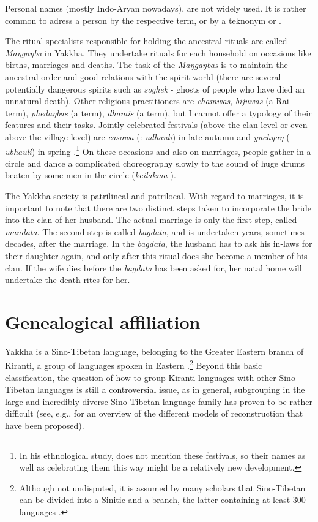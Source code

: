 Personal names (mostly Indo-Aryan nowadays), are not widely used. It is rather common to adress a person by the respective  term, or by a teknonym  or . 

The ritual specialists responsible for holding the ancestral rituals are called \emph{Maŋgaŋba} in Yakkha. They undertake rituals for each household on occasions like births, marriages and deaths. The task of the \emph{Maŋgaŋbas} is to maintain the ancestral order and good relations with the spirit world (there are several potentially dangerous spirits such as \emph{soghek} - ghosts of people who have died an unnatural death). Other religious practitioners are \emph{chamwas},  \emph{bijuwas} (a Rai term), \emph{phedaŋbas} (a  term), \emph{dhamis} (a  term), but I cannot offer a typology of their features and their tasks. Jointly celebrated festivals (above the clan level or even above the village level) are \emph{casowa} (: \emph{udhauli}) in late autumn and \emph{yuchyaŋ} ( \emph{ubhauli}) in spring \citep[102]{Kongren2007Indigenous}.\footnote{In his ethnological study, \citet{Russell1992_Yakha}  does not mention these festivals, so their names as well as  celebrating them this way might be a relatively new development.} On these occasions and also on marriages, people gather in a circle and dance a complicated choreography slowly to the sound of huge drums beaten by some men in the circle (\emph{keilakma} ).

The Yakkha society is patrilineal and patrilocal. With regard to marriages, it is important to note that there are two distinct steps taken to incorporate the bride into the clan of her husband. The actual marriage is only the first step, called \emph{mandata}. The second step is called \emph{bagdata}, and is undertaken years, sometimes decades, after the marriage. In the \emph{bagdata}, the husband has to ask his in-laws for their daughter again, and only after this ritual does she become a member of his clan. If the wife dies before the \emph{bagdata} has been asked for, her natal home will undertake the death rites for her.

 
\section{Genealogical affiliation}\label{genetic}

Yakkha is a Sino-Tibetan language, belonging to the Greater Eastern branch of Kiranti, a group of  languages spoken in Eastern .\footnote{Although not  undisputed, it is assumed by many scholars that Sino-Tibetan can be divided into a Sinitic and a  branch, the latter containing at least 300 languages \citep{Bradley1997_Tibeto-Burman, Matisoff2003Handbook}.}  Beyond this basic classification, the question of how to group Kiranti languages with other Sino-Tibetan languages is still a controversial issue, as in general, subgrouping in the large and incredibly diverse Sino-Tibetan language family has proven to be rather difficult (see, e.g., \citealt[Chapter 3]{Hyslop2011_Kurtop} for an overview of the different models of reconstruction that have been proposed).

